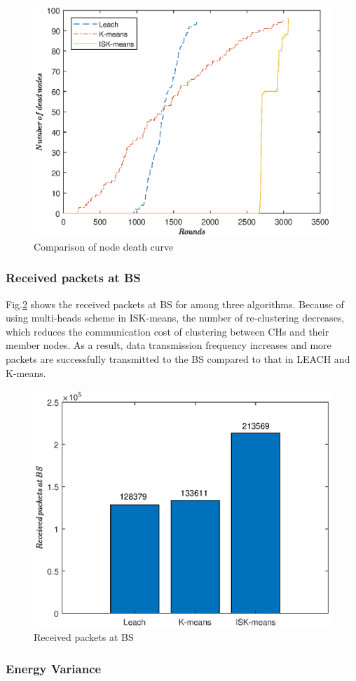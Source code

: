\documentclass[11pt]{report}
\begin{document}
	\begin{figure}[h!]
		\centering
		\includegraphics[width=0.7\linewidth]{nodedead.eps}
		\caption{Comparison of node death curve}
		\label{fig10}
	\end{figure}

	\subsubsection{Received packets at BS}
	Fig.\ref{fig11} shows the received packets at BS for among three algorithms. Because of using multi-heads scheme in ISK-means, the number of re-clustering decreases, which reduces the communication cost of clustering between CHs and their member nodes. As a result, data transmission frequency increases and more packets are successfully transmitted to the BS compared to that in LEACH and K-means.
	
	\begin{figure}[h!]
		\centering
		\includegraphics[width=0.7\linewidth]{packet1.eps}
		\caption{Received packets at BS}
		\label{fig11}
	\end{figure}
	\subsubsection{Energy Variance}
	
\end{document}
